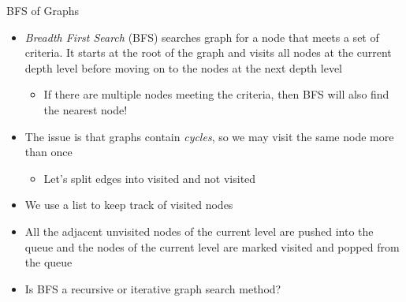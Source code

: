 \documentclass[
  ignorenonframetext,
]{beamer}
\providecommand{\tightlist}{%
  \setlength{\itemsep}{0pt}\setlength{\parskip}{0pt}}\usepackage{longtable,booktabs,array}
\begin{document}
\begin{frame}{BFS of Graphs}
\protect\hypertarget{bfs-of-graphs}{}
\begin{itemize}
\item
  \emph{Breadth First Search} (BFS) searches graph for a node that meets
  a set of criteria. It starts at the root of the graph and visits all
  nodes at the current depth level before moving on to the nodes at the
  next depth level

  \begin{itemize}
  \tightlist
  \item
    If there are multiple nodes meeting the criteria, then BFS will also
    find the nearest node!
  \end{itemize}
\item
  The issue is that graphs contain \emph{cycles}, so we may visit the
  same node more than once

  \begin{itemize}
  \tightlist
  \item
    Let's split edges into visited and not visited
  \end{itemize}
\item
  We use a list to keep track of visited nodes
\item
  All the adjacent unvisited nodes of the current level are pushed into
  the queue and the nodes of the current level are marked visited and
  popped from the queue
\item
  Is BFS a recursive or iterative graph search method?
\end{itemize}
\end{frame}
\end{document}
